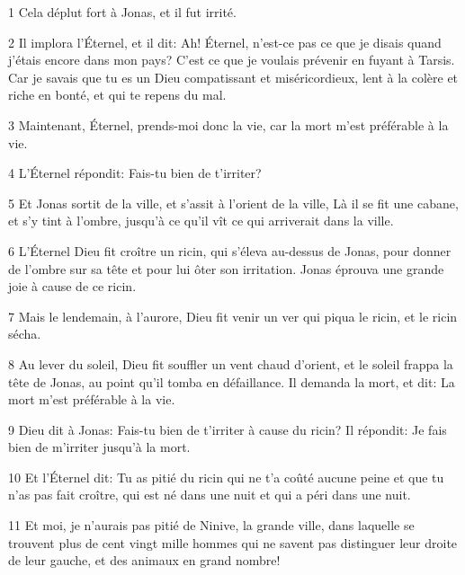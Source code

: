 \par 1 Cela déplut fort à Jonas, et il fut irrité.
\par 2 Il implora l'Éternel, et il dit: Ah! Éternel, n'est-ce pas ce que je disais quand j'étais encore dans mon pays? C'est ce que je voulais prévenir en fuyant à Tarsis. Car je savais que tu es un Dieu compatissant et miséricordieux, lent à la colère et riche en bonté, et qui te repens du mal.
\par 3 Maintenant, Éternel, prends-moi donc la vie, car la mort m'est préférable à la vie.
\par 4 L'Éternel répondit: Fais-tu bien de t'irriter?
\par 5 Et Jonas sortit de la ville, et s'assit à l'orient de la ville, Là il se fit une cabane, et s'y tint à l'ombre, jusqu'à ce qu'il vît ce qui arriverait dans la ville.
\par 6 L'Éternel Dieu fit croître un ricin, qui s'éleva au-dessus de Jonas, pour donner de l'ombre sur sa tête et pour lui ôter son irritation. Jonas éprouva une grande joie à cause de ce ricin.
\par 7 Mais le lendemain, à l'aurore, Dieu fit venir un ver qui piqua le ricin, et le ricin sécha.
\par 8 Au lever du soleil, Dieu fit souffler un vent chaud d'orient, et le soleil frappa la tête de Jonas, au point qu'il tomba en défaillance. Il demanda la mort, et dit: La mort m'est préférable à la vie.
\par 9 Dieu dit à Jonas: Fais-tu bien de t'irriter à cause du ricin? Il répondit: Je fais bien de m'irriter jusqu'à la mort.
\par 10 Et l'Éternel dit: Tu as pitié du ricin qui ne t'a coûté aucune peine et que tu n'as pas fait croître, qui est né dans une nuit et qui a péri dans une nuit.
\par 11 Et moi, je n'aurais pas pitié de Ninive, la grande ville, dans laquelle se trouvent plus de cent vingt mille hommes qui ne savent pas distinguer leur droite de leur gauche, et des animaux en grand nombre!


